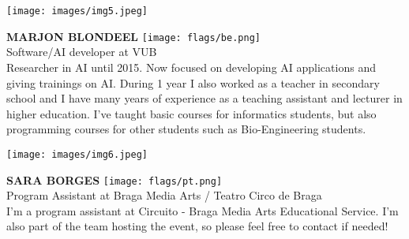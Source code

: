 \noindent
\begin{minipage}{0.3\textwidth}
\centering
\texttt{[image: images/img5.jpeg]}
\end{minipage}
\hfill
\begin{minipage}{0.6\textwidth}\raggedright
\color{color1}\uppercase{\textbf{Marjon Blondeel}}
\color{color2}\hspace{0.2cm}\texttt{[image: flags/be.png]}
\\
Software/AI developer at VUB\\
{\footnotesize Researcher in AI until 2015. Now focused on developing AI applications and giving trainings on AI. During 1 year I also worked as a teacher in secondary school and I have many years of experience as a teaching assistant and lecturer in higher education. I've taught basic courses for informatics students, but also programming courses for other students such as Bio-Engineering students. }\\
\end{minipage}
\newline\newline\newline

\noindent
\begin{minipage}{0.3\textwidth}
\centering
\texttt{[image: images/img6.jpeg]}
\end{minipage}
\hfill
\begin{minipage}{0.6\textwidth}\raggedright
\color{color1}\uppercase{\textbf{Sara Borges}}
\color{color2}\hspace{0.2cm}\texttt{[image: flags/pt.png]}
\\
Program Assistant at Braga Media Arts / Teatro Circo de Braga\\
{\footnotesize I'm a program assistant at Circuito - Braga Media Arts Educational Service. I'm also part of the team hosting the event, so please feel free to contact if needed! 
}\\
\end{minipage}
\newline\newline\newline

